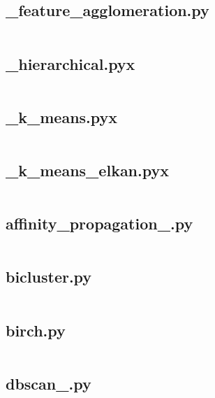 \documentclass{article}
\begin{document}
\subsection{\_feature\_agglomeration.py}
\inputminted{python}{/home/dufferzafar/dev/@clones/scikit-learn/sklearn/cluster/_feature_agglomeration.py}
\newpage

\subsection{\_hierarchical.pyx}
\inputminted{cython}{/home/dufferzafar/dev/@clones/scikit-learn/sklearn/cluster/_hierarchical.pyx}
\newpage

\subsection{\_k\_means.pyx}
\inputminted{cython}{/home/dufferzafar/dev/@clones/scikit-learn/sklearn/cluster/_k_means.pyx}
\newpage

\subsection{\_k\_means\_elkan.pyx}
\inputminted{cython}{/home/dufferzafar/dev/@clones/scikit-learn/sklearn/cluster/_k_means_elkan.pyx}
\newpage

\subsection{affinity\_propagation\_.py}
\inputminted{python}{/home/dufferzafar/dev/@clones/scikit-learn/sklearn/cluster/affinity_propagation_.py}
\newpage

\subsection{bicluster.py}
\inputminted{python}{/home/dufferzafar/dev/@clones/scikit-learn/sklearn/cluster/bicluster.py}
\newpage

\subsection{birch.py}
\inputminted{python}{/home/dufferzafar/dev/@clones/scikit-learn/sklearn/cluster/birch.py}
\newpage

\subsection{dbscan\_.py}
\inputminted{python}{/home/dufferzafar/dev/@clones/scikit-learn/sklearn/cluster/dbscan_.py}
\newpage
\end{document}
